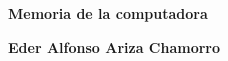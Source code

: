 \documentclass{article}
\begin{document}
\begin{titlepage}
    \begin{center}
    	
    	\vspace*{1cm}
    	
    	\Huge
    	\textbf{Memoria de la computadora}
    	
    	\vspace{2cm}
    	
    	\LARGE
    	\textbf{Eder Alfonso Ariza Chamorro}
    	
    	\vfill
    	
	\end{center}
\end{titlepage}
\end{document}
